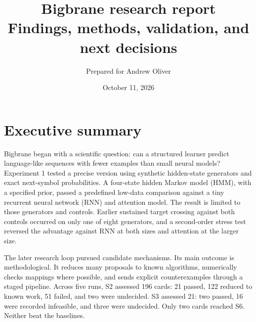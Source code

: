 
\usepackage{amsmath,amssymb}
\usepackage{needspace}
\title{\vspace{-1.2cm}\color{palA}\Huge Bigbrane research report\\[3pt]\large Findings, methods, validation, and next decisions}
\author{Prepared for Andrew Oliver}
\date{October 11, 2026}

\maketitle
\thispagestyle{fancy}

\section{Executive summary}

Bigbrane began with a scientific question: can a structured learner predict language-like sequences with fewer examples than small neural models? Experiment 1 tested a precise version using synthetic hidden-state generators and exact next-symbol probabilities. A four-state hidden Markov model (HMM), with a specified prior, passed a predefined low-data comparison against a tiny recurrent neural network (RNN) and attention model. The result is limited to those generators and controls. Earlier sustained target crossing against both controls occurred on only one of eight generators, and a second-order stress test reversed the advantage against RNN at both sizes and attention at the larger size.

The later research loop pursued candidate mechanisms. Its main outcome is methodological. It reduces many proposals to known algorithms, numerically checks mappings where possible, and sends explicit counterexamples through a staged pipeline. Across five runs, S2 assessed 196 cards: 21 passed, 122 reduced to known work, 51 failed, and two were undecided. S3 assessed 21: two passed, 16 were recorded infeasible, and three were undecided. Only two cards reached S6. Neither beat the baselines.

